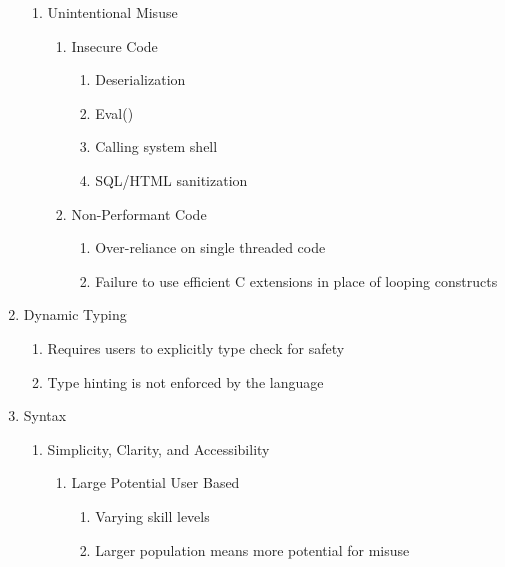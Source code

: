\begin{enumerate}
\begin{enumerate}
                \item Unintentional Misuse
                \begin{enumerate}
                        \item Insecure Code
                        \begin{enumerate}
                                \item Deserialization
                                \item Eval()
                                \item Calling system shell
                                \item SQL/HTML sanitization
                        \end{enumerate}
                        \item Non-Performant Code
                        \begin{enumerate}
                                \item Over-reliance on single threaded code
                                \item Failure to use efficient C extensions in place of looping constructs
                        \end{enumerate}
                \end{enumerate}
        \end{enumerate} %

        \item Dynamic Typing
        \begin{enumerate}
                \item Requires users to explicitly type check for safety
                \item Type hinting is not enforced by the language
        \end{enumerate}           

        \item Syntax
        \begin{enumerate}
                \item Simplicity, Clarity, and Accessibility
                \begin{enumerate}
                        \item Large Potential User Based
                        \begin{enumerate}
                                \item Varying skill levels
                                \item Larger population means more potential for misuse
                        \end{enumerate}
                \end{enumerate}
        \end{enumerate} %


\end{enumerate}
